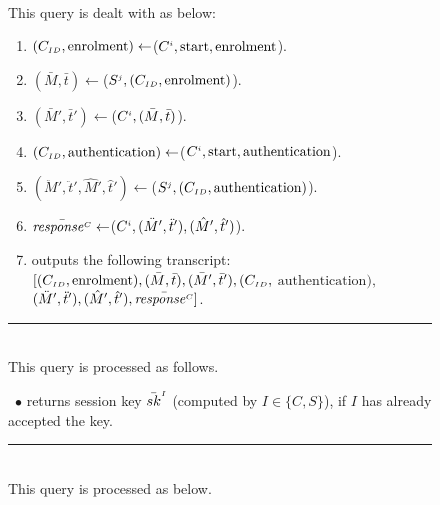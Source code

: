 \begin{figure}[H]
\setlength{\fboxsep}{1pt}
\begin{center}
    \begin{tcolorbox}[enhanced,width=4.7in, left=0.1cm, 
    drop fuzzy shadow southwest,
    colframe=black,colback=white]
{\small{

 \\
 
 This query is dealt with as below: 
 \begin{enumerate} 
 \item $(C_{\scriptscriptstyle ID},  \text{enrolment})\gets$\send($C^{\scriptscriptstyle i}, \text{start}, \text{enrolment}$).%
\item  $(\bar M,\bar t)\gets$\send($S^{\scriptscriptstyle j}, (C_{\scriptscriptstyle ID},  \text{enrolment})$).
\item $(\bar M', \bar t')\gets$\send($C^{\scriptscriptstyle i}, (\bar M, \bar t)$).
\item $(C_{\scriptscriptstyle ID},  \text{authentication})\gets$\send($C^{\scriptscriptstyle i}, \text{start}, \text{authentication}$).
\item $(\ddot M', \ddot t', \hat M', \hat t')\gets$\send($S^{\scriptscriptstyle j}, (C_{\scriptscriptstyle ID},  \text{authentication})$).
\item $\bar{\mathit{response}^{\scriptscriptstyle C}}\gets$\send($C^{\scriptscriptstyle i}, (\ddot M', \ddot t'), (\hat M', \hat t')$).
  \item outputs the following transcript: $[(C_{\scriptscriptstyle ID},  \text{enrolment}), (\bar M, \bar t), (\bar M', \bar t'),(C_{\scriptscriptstyle ID},  $ $\text{authentication}), $ $(\ddot M', \ddot t'), (\hat M', \hat t'), \bar{\mathit{response}^{\scriptscriptstyle C}}]$.
 \end{enumerate} 
  \noindent\rule{4.6in}{1pt}
  \\
  
This query is processed as follows.
  
\ $\bullet$ returns session key $\bar {sk}^{\scriptscriptstyle I}$ (computed by $I\in\{C,S \}$), if $I$ has already accepted the key.
  
  \noindent\rule{4.6in}{1pt}
    \\
    
  This query is processed as below.  
  
}}
\end{tcolorbox}
\end{center}
\end{figure}
